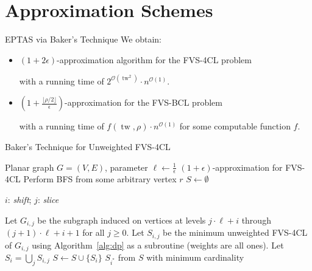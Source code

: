 \documentclass{beamer}
\newcommand{\tw}{\operatorname{tw}}
\begin{document}
\section{Approximation Schemes}

\begin{frame}{EPTAS via Baker's Technique}
  We obtain:
  \begin{itemize}
    \item $(1 + 2\epsilon)$-approximation algorithm for the FVS-4CL problem
    
    with a running time of $2^{\mathcal{O}(\tw^2)} \cdot n^{\mathcal{O}(1)}$.
    \item \(\left(1 + \frac{\lfloor\rho/2\rfloor}{\epsilon}\right)\)-approximation for the FVS-BCL problem 
    
    with a running time of \( f\left(\tw, \rho\right) \cdot n^{\mathcal{O}\left(1\right)} \) 
    for some computable function $f$.
  \end{itemize}
\end{frame}

\begin{frame}[fragile]{Baker's Technique for Unweighted FVS-4CL}
\small %
    \begin{algorithm}[H]
        \caption{Baker's technique for the unweighted FVS-4CL}
        \label{alg:unweighted_feedback_vertex_set_global}
        \begin{algorithmic}[1]
        \REQUIRE Planar graph $G = (V, E)$, parameter $\ell \leftarrow \frac{1}{\epsilon}$
        \ENSURE $(1 + \epsilon)$-approximation for \textsc{FVS-4CL}
        \STATE Perform \textsc{BFS} from some arbitrary vertex $r$ \label{alg3:line1}
        \STATE $S \leftarrow \emptyset$

        $i$: \textit{shift}; $j$: \textit{slice}

         \label{alg3:for-loop}
            \STATE Let $G_{i, j}$ be the subgraph induced on vertices at levels
            $j \cdot \ell + i$ through $(j+1) \cdot \ell + i + 1$ for all $j \geq 0$. \label{alg3:line4}
            \STATE Let $S_{i, j}$ be the minimum unweighted \textsc{FVS-4CL} of 
            $G_{i, j}$ using Algorithm~\ref{alg:dp} as a subroutine (weights are all ones). 
            \label{alg3:subroutine}
            \STATE Let $S_i = \bigcup_{j} S_{i, j}$ \label{alg3:line6}
            \STATE $S \leftarrow S \cup \{S_i\}$ \label{alg3:line7}
        \ENDFOR
        \RETURN $S_{i^*}$ from $S$ with minimum cardinality \label{alg3:line9}
        \end{algorithmic}
    \end{algorithm}
\end{frame}
\end{document}
